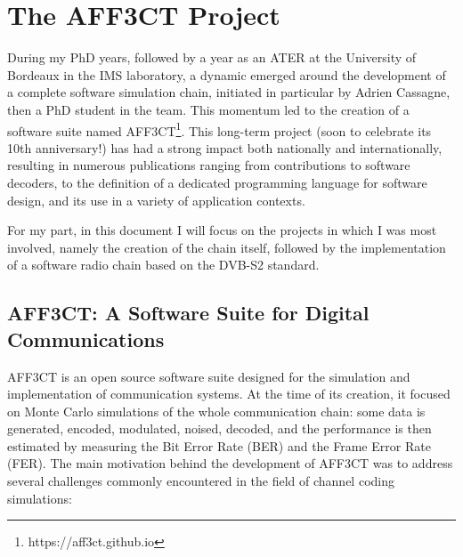 \documentclass[11pt]{report}
\begin{document}
\newpage
\section{The AFF3CT Project}
During my PhD years, followed by a year as an ATER at the University of Bordeaux in the IMS laboratory, a dynamic emerged around the development of a complete software simulation chain, initiated in particular by Adrien Cassagne, then a PhD student in the team. This momentum led to the creation of a software suite named AFF3CT\footnote{https://aff3ct.github.io}\cite{cassagne:hal-02358306}. This long-term project (soon to celebrate its 10th anniversary!) has had a strong impact both nationally and internationally, resulting in numerous publications ranging from contributions to software decoders, to the definition of a dedicated programming language for software design, and its use in a variety of application contexts.

For my part, in this document I will focus on the projects in which I was most involved, namely the creation of the chain itself, followed by the implementation of a software radio chain based on the DVB-S2 standard.

\subsection{AFF3CT: A Software Suite for Digital Communications}

AFF3CT is an open source software suite designed for the simulation and implementation of communication systems. At the time of its creation, it focused on Monte Carlo simulations of the whole communication chain: some data is generated, encoded, modulated, noised, decoded, and the performance is then estimated by measuring the Bit Error Rate (BER) and the Frame Error Rate (FER). The main motivation behind the development of AFF3CT was to address several challenges commonly encountered in the field of channel coding simulations:
\end{document}
